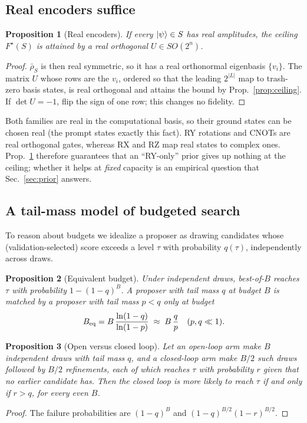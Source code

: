 \documentclass[11pt]{article}
\newtheorem{proposition}{Proposition}
\begin{document}
\subsection{Real encoders suffice}

\begin{proposition}[Real encoders]
\label{prop:real}
If every $\ket\psi\in S$ has real amplitudes, the ceiling $F^\star(S)$ is attained
by a real orthogonal $U\in SO(2^n)$.
\end{proposition}
\begin{proof}
$\bar\rho_S$ is then real symmetric, so it has a real orthonormal eigenbasis
$\{v_i\}$. The matrix $U$ whose rows are the $v_i$, ordered so that the leading
$2^{|L|}$ map to trash-zero basis states, is real orthogonal and attains the bound by
Prop.~\ref{prop:ceiling}. If $\det U=-1$, flip the sign of one row; this changes no
fidelity.
\end{proof}

Both families are real in the computational basis, so their ground states can be
chosen real (the prompt states exactly this fact).
RY rotations and CNOTs are real orthogonal gates, whereas RX and RZ map real states to
complex ones.
Prop.~\ref{prop:real} therefore guarantees that an ``RY-only'' prior gives up nothing
at the ceiling; whether it helps at \emph{fixed} capacity is an empirical question
that Sec.~\ref{sec:prior} answers.

\subsection{A tail-mass model of budgeted search}

To reason about budgets we idealize a proposer as drawing candidates whose
(validation-selected) score exceeds a level $\tau$ with probability $q(\tau)$,
independently across draws.

\begin{proposition}[Equivalent budget]
\label{prop:budget}
Under independent draws, best-of-$B$ reaches $\tau$ with probability
$1-(1-q)^B$. A proposer with tail mass $q$ at budget $B$ is matched by a proposer with
tail mass $p<q$ only at budget
\begin{equation}
B_{\rm eq}=B\,\frac{\ln(1-q)}{\ln(1-p)}\;\approx\;B\,\frac{q}{p}\quad(p,q\ll1).
\end{equation}
\end{proposition}

\begin{proposition}[Open versus closed loop]
\label{prop:loop}
Let an open-loop arm make $B$ independent draws with tail mass $q$, and a closed-loop
arm make $B/2$ such draws followed by $B/2$ refinements, each of which reaches $\tau$
with probability $r$ given that no earlier candidate has. Then the closed loop is more
likely to reach $\tau$ if and only if $r>q$, for every even $B$.
\end{proposition}
\begin{proof}
The failure probabilities are $(1-q)^B$ and $(1-q)^{B/2}(1-r)^{B/2}$.
\end{proof}
\end{document}
